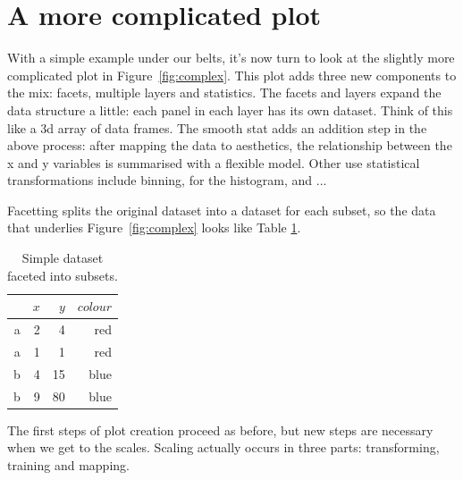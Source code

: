 \section{A more complicated plot}
\label{sec:complex-plot} 

With a simple example under our belts, it's now turn to look at the slightly more complicated plot in Figure~\ref{fig:complex}.  This plot adds three new components to the mix: facets, multiple layers and statistics.  The facets and layers expand the data structure a little:  each panel in each layer has its own dataset.  Think of this like a 3d array of data frames.  The smooth stat adds an addition step in the above process: after mapping the data to aesthetics, the relationship between the x and y variables is summarised with a flexible model.  Other use statistical transformations include binning, for the histogram, and ...

% 


Facetting splits the original dataset into a dataset for each subset, so the data that underlies Figure~\ref{fig:complex} looks like Table \ref{tbl:complex}.

\begin{table}[ht]
  \centering
  \begin{tabular}{r|r|r|r}
    & $x$ & $y$ & $colour$\\
    \hline
    a & 2 & 4 & red\\
    a & 1 & 1 & red\\
    \hline \hline
    b & 4 & 15 & blue\\
    b & 9 & 80 & blue
  \end{tabular}

  \caption{Simple dataset faceted into subsets.}
  \label{tbl:complex}
\end{table}

The first steps of plot creation proceed as before, but new steps are necessary when we get to the scales.   Scaling actually occurs in three parts: transforming, training and mapping. 

